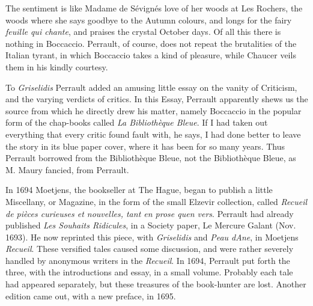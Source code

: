 \documentclass[14pt,a4paper]{memoir}
\begin{document}
The sentiment is like Madame de Sévigné\textquotesingle s love of her
woods at Les Rochers, the woods where she says goodbye to the Autumn
colours, and longs for the fairy \emph{feuille} \emph{qui chante}, and
praises \textquotesingle the crystal October days.\textquotesingle{} Of
all this there is nothing in Boccaccio. Perrault, of course, does not
repeat the brutalities of the Italian tyrant, in which Boccaccio takes a
kind of pleasure, while Chaucer veils them in his kindly courtesy.

To \emph{Griselidis} Perrault added an amusing little essay on the
vanity of Criticism, and the varying verdicts of critics. In this Essay,
Perrault apparently shews us the source from which he directly drew his
matter, namely Boccaccio in the popular form of the chap-books called
\emph{La Bibliothèque Bleue}. \textquotesingle If I had taken out
everything that every critic found fault with,\textquotesingle{} he
says, \textquotesingle I had done better to leave the story in its blue
paper cover, where it has been for so many years.\textquotesingle{} Thus
Perrault borrowed from the Bibliothèque Bleue, not the Bibliothèque
Bleue, as M. Maury fancied, from
Perrault.

In 1694 Moetjens, the bookseller at The Hague, began to publish a little
Miscellany, or Magazine, in the form of the small Elzevir collection,
called \emph{Recueil de pièces curieuses et nouvelles, tant en prose
qu\textquotesingle en vers}. Perrault had already published \emph{Les
Souhaits Ridicules}, in a Society paper, Le Mercure Galant (Nov. 1693).
He now reprinted this piece, with \emph{Griselidis} and \emph{Peau
d\textquotesingle Ane}, in Moetjens\textquotesingle{}
\emph{Recueil}.
These versified tales caused some discussion, and were rather severely
handled by anonymous writers in the \emph{Recueil}. In 1694, Perrault
put forth the three, with the introductions and essay, in a small
volume. Probably each tale had appeared separately, but these treasures
of the book-hunter are lost. Another edition came out, with a new
preface, in
1695.
\end{document}

